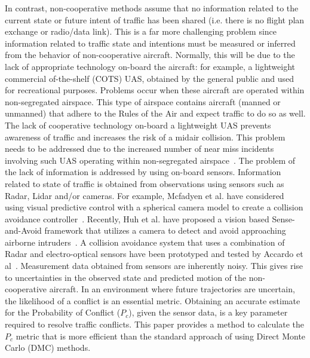 \documentclass[journal]{IEEEtran}
\begin{document}
In contrast, non-cooperative methods assume that no information related to the current state or future intent of traffic has been shared (i.e. there is no flight plan exchange or radio/data link). This is a far more challenging problem since information related to traffic state and intentions must be measured or inferred from the behavior of non-cooperative aircraft. Normally, this will be due to the lack of appropriate technology on-board the aircraft: for example, a lightweight commercial of-the-shelf (COTS) UAS, obtained by the general public and used for recreational purposes. Problems occur when these aircraft are operated within non-segregated airspace. This type of airspace contains aircraft (manned or unmanned) that adhere to the Rules of the Air and expect traffic to do so as well. The lack of cooperative technology on-board a lightweight UAS prevents awareness of traffic and increases the risk of a midair collision. This problem needs to be addressed due to the increased number of near miss incidents involving such UAS operating within non-segregated airspace~\cite{WashpostAug2015NearMiss}. The problem of the lack of information is addressed by using on-board sensors. Information related to state of traffic is obtained from observations using sensors such as Radar, Lidar and/or cameras. For example, Mcfadyen et al. have considered using visual predictive control with a spherical camera model to create a collision avoidance controller~\cite{mcfadyen2013aircraft}. Recently, Huh et al. have proposed a vision based Sense-and-Avoid framework that utilizes a camera to detect and avoid approaching airborne intruders~\cite{HUH2010}. A collision avoidance system that uses a combination of Radar and electro-optical sensors have been prototyped and tested by Accardo et al~\cite{Accardo2013}. Measurement data obtained from sensors are inherently noisy. This gives rise to uncertainties in the observed state and predicted motion of the non-cooperative aircraft. In an environment where future trajectories are uncertain, the likelihood of a conflict is an essential metric. Obtaining an accurate estimate for the Probability of Conflict ($P_{c}$), given the sensor data, is a key parameter required to resolve traffic conflicts. This paper provides a method to calculate the $P_{c}$ metric that is more efficient than the standard approach of using Direct Monte Carlo (DMC) methods.
\end{document}
